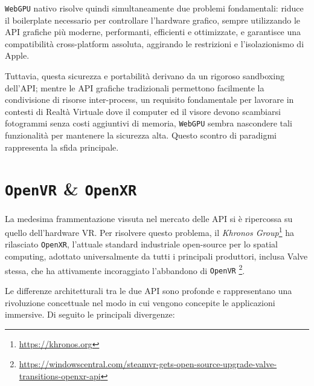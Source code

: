 \documentclass[a4paper, 11pt, twoside]{report}
\begin{document}
\texttt{WebGPU} nativo risolve quindi simultaneamente due problemi fondamentali: riduce il boilerplate necessario per
controllare l'hardware grafico, sempre utilizzando le API grafiche più moderne, performanti, efficienti e ottimizzate,
e garantisce una compatibilità cross-platform assoluta, aggirando le restrizioni e l'isolazionismo di Apple.

Tuttavia, questa sicurezza e portabilità derivano da un rigoroso sandboxing dell'API; mentre le API grafiche
tradizionali permettono facilmente la condivisione di risorse inter-process, un requisito fondamentale per lavorare
in contesti di Realtà Virtuale dove il computer ed il visore devono scambiarsi fotogrammi senza costi aggiuntivi di
memoria, \texttt{WebGPU} sembra nascondere tali funzionalità per mantenere la sicurezza alta.
Questo scontro di paradigmi rappresenta la sfida principale.

\section{\texttt{\gls{OpenVR}} \& \texttt{\gls{OpenXR}}}

La medesima frammentazione vissuta nel mercato delle API si è ripercossa su quello dell'hardware VR. Per risolvere
questo problema, il \textit{Khronos Group}\footnote{\url{https://khronos.org}} ha rilasciato \texttt{\gls{OpenXR}},
l'attuale standard industriale open-source per lo spatial computing, adottato universalmente da tutti i principali
produttori, inclusa Valve stessa, che ha attivamente incoraggiato l'abbandono di \texttt{\gls{OpenVR}}
\footnote{\url{https://windowscentral.com/steamvr-gets-open-source-upgrade-valve-transitions-openxr-api}}.

Le differenze architetturali tra le due API sono profonde e rappresentano una rivoluzione concettuale nel modo in cui
vengono concepite le applicazioni immersive. Di seguito le principali divergenze:
\end{document}
